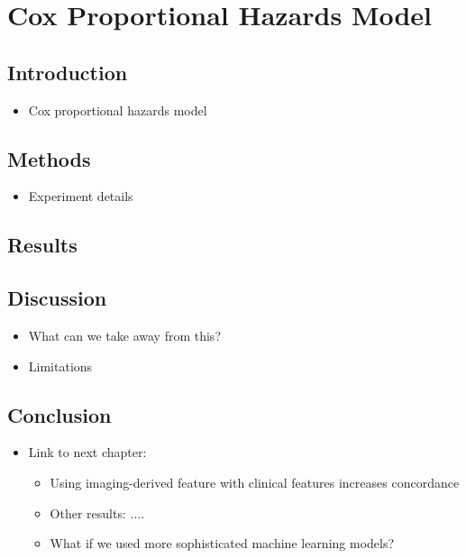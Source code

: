 \chapter{Cox Proportional Hazards Model}
\label{cox_proportional_hazards_model}

\section{Introduction}
\begin{itemize}
    \item Cox proportional hazards model
\end{itemize}

\section{Methods}
\begin{itemize}
    \item Experiment details
\end{itemize}

\section{Results}

\section{Discussion}
\begin{itemize}
    \item What can we take away from this?
    \item Limitations
\end{itemize}

\section{Conclusion}
\begin{itemize}
    \item Link to next chapter:
    \begin{itemize}
        \item Using imaging-derived feature with clinical features increases concordance
        \item Other results: ....
        \item What if we used more sophisticated machine learning models?
    \end{itemize}
\end{itemize}